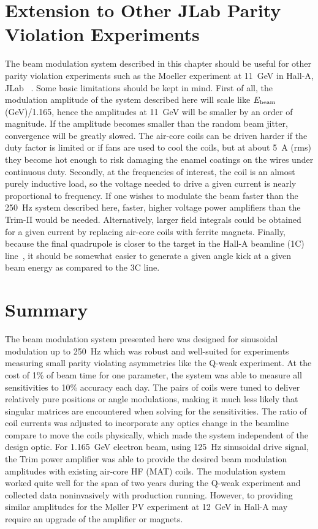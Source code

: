 \section{Extension to Other JLab Parity Violation Experiments}
\label{Extension to Other JLab Parity Violation Experiments}
The beam modulation system described in this chapter should be useful for other parity violation experiments such as the Moeller experiment at 11~GeV in Hall-A, JLab ~\cite{moller_2010}. Some basic limitations should be kept in mind. First of all, the modulation amplitude of the system described here will scale like $E_{\rm beam}$ (GeV)/1.165, hence the amplitudes at 11~GeV will be smaller by an order of magnitude. If the amplitude becomes smaller than the random beam jitter, convergence will be greatly slowed. The air-core coils can be driven harder if the duty factor is limited or if fans are used to cool the coils, but at about 5~A (rms) they become hot enough to risk damaging the enamel coatings on the wires under continuous duty. Secondly, at the frequencies of interest, the coil is an almost purely inductive load, so the voltage needed to drive a given current is nearly proportional to frequency. If one wishes to modulate the beam faster than the 250~Hz system described here, faster, higher voltage power amplifiers than the Trim-II would be needed. Alternatively, larger field integrals could be obtained for a given current by replacing air-core coils with ferrite magnets. Finally, because the final quadrupole is closer to the target in the Hall-A beamline (1C) line~\cite{nur_halla_beamline}, it should be somewhat easier to generate a given angle kick at a given beam energy as compared to the 3C line. 

\section{Summary}
\label{Summary}
The beam modulation system presented here was designed for sinusoidal modulation up to 250~Hz which was robust and well-suited for experiments measuring small parity violating asymmetries like the Q-weak experiment. At the cost of 1\% of beam time for one parameter, the system was able to measure all sensitivities to 10\% accuracy each day. The pairs of coils were tuned to deliver relatively pure positions or angle modulations, making it much less likely that singular matrices are encountered when solving for the sensitivities. The ratio of coil currents was adjusted to incorporate any optics change in the beamline compare to move the coils physically, which made the system independent of the design optic. For 1.165~GeV electron beam, using 125~Hz sinusoidal drive signal, the Trim power amplifier was able to provide the desired beam modulation amplitudes with existing air-core HF (MAT) coils. The modulation system worked quite well for the span of two years during the Q-weak experiment and collected data noninvasively with production running. However, to providing similar amplitudes for the M{\o}ller PV experiment at 12~GeV in Hall-A may require an upgrade of the amplifier or magnets. 

